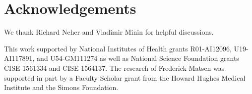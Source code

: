 \documentclass{article}
\newcommand{\beginsupplement}{%
        \setcounter{table}{0}
        \renewcommand{\thetable}{S\arabic{table}}%
        \setcounter{figure}{0}
        \renewcommand{\thefigure}{S\arabic{figure}}%
     }
\begin{document}
\section*{Acknowledgements}
We thank Richard Neher and Vladimir Minin for helpful discussions.

This work supported by National Institutes of Health grants R01-AI12096, U19-AI117891, and U54-GM111274 as well as National Science Foundation grants CISE-1561334 and CISE-1564137.
The research of Frederick Matsen was supported in part by a Faculty Scholar grant from the Howard Hughes Medical Institute and the Simons Foundation.




\newpage
\beginsupplement


\end{document}
